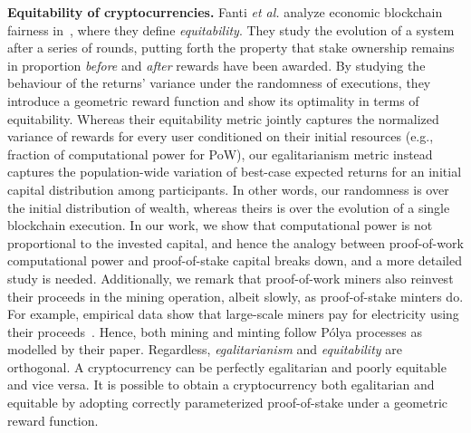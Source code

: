 \noindent\textbf{Equitability of cryptocurrencies.}
Fanti \textit{et al.} analyze economic blockchain fairness
in~\cite{equitability}, where they define \emph{equitability}. They study the
evolution of a system after a series of rounds, putting forth the property that
stake ownership remains in proportion \emph{before} and \emph{after} rewards
have been awarded.
By studying the behaviour of the returns' variance under the randomness of
executions, they introduce a geometric reward function and show its optimality
in terms of equitability.  Whereas their equitability metric jointly captures
the normalized variance of rewards for every user conditioned on their initial
resources (e.g., fraction of computational power for PoW), our egalitarianism
metric instead captures the population-wide variation of best-case expected
returns for an initial capital distribution among participants. In other words,
our randomness is over the initial distribution of wealth, whereas theirs is
over the evolution of a single blockchain execution.
In our work, we show that
computational power is not proportional to the invested capital, and hence the
analogy between proof-of-work computational power and proof-of-stake capital
breaks down, and a more detailed study is needed. Additionally, we remark that
proof-of-work miners also reinvest their proceeds in the mining operation,
albeit slowly, as proof-of-stake minters do. For example, empirical data show
that large-scale miners pay for electricity using their
proceeds~\cite{kharif2018}. Hence, both mining and minting follow Pólya
processes as modelled by their paper.
Regardless, \emph{egalitarianism} and \emph{equitability} are orthogonal. A
cryptocurrency can be perfectly egalitarian and poorly equitable and vice versa.
It is possible to obtain a cryptocurrency both egalitarian and equitable by
adopting correctly parameterized proof-of-stake under a geometric reward
function.
